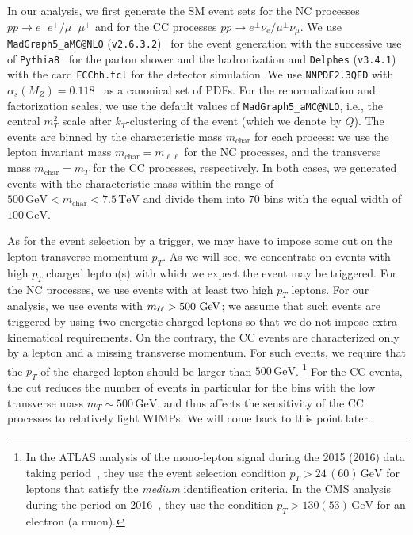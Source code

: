 \documentclass[12pt,twoside,book]{article}
\begin{document}
In our analysis, we first generate the SM event sets for the NC processes $pp\to e^{-}e^{+} / \mu^{-}\mu^{+}$ and for the CC processes $pp\to e^{\pm}\nu_e / \mu^{\pm}\nu_\mu$.
We use \texttt{MadGraph5\_aMC@NLO} (\texttt{v2.6.3.2})~\cite{Alwall:2011uj, Alwall:2014hca} for the event generation with the successive use of \texttt{Pythia8}~\cite{Sjostrand:2014zea} for the parton shower and the hadronization and \texttt{Delphes} (\texttt{v3.4.1})~\cite{deFavereau:2013fsa} with the card {\tt FCChh.tcl} for the detector simulation.
We use \texttt{NNPDF2.3QED} with $\alpha_s (M_Z) = 0.118$~\cite{Ball:2013hta} as a canonical set of PDFs.
For the renormalization and factorization scales, we use the default values of \texttt{MadGraph5\_aMC@NLO}, i.e., the central $m_T^2$ scale after $k_T$-clustering of the event (which we denote by $Q$).
The events are binned by the characteristic mass $m_{\mathrm{char}}$ for each process: we use the lepton invariant mass $m_{\mathrm{char}} = m_{\ell\ell}$ for the NC processes, and the transverse mass $m_{\mathrm{char}} = m_T$ for the CC processes, respectively.
In both cases, we generated events with the characteristic mass within the range of $500\,\mathrm{GeV} < m_\mathrm{char} < 7.5\,\mathrm{TeV}$ and divide them into $70$ bins with the equal width of $100\,\mathrm{GeV}$.

As for the event selection by a trigger, we may have to impose some cut on the lepton transverse momentum $p_T$.
As we will see, we concentrate on events with high $p_T$ charged lepton(s) with which we expect the event may be triggered.
For the NC processes, we use events with at least two high $p_T$ leptons.  For our analysis, we use events with $m_{\ell\ell}>500\ {\rm GeV}$; we assume that such events are triggered by using two energetic charged leptons so that we do not impose extra kinematical requirements.
On the contrary, the CC events are characterized only by a lepton and a missing transverse momentum.
For such events, we require that the $p_T$ of the charged lepton should be larger than $500\,\mathrm{GeV}$.
\footnote{
  In the ATLAS analysis of the mono-lepton signal during the 2015 (2016) data taking period~\cite{Aaboud:2017efa}, they use the event selection condition $p_T > 24\, (60)\,\mathrm{GeV}$ for leptons that satisfy the \textit{medium} identification criteria.
  In the CMS analysis during the period on 2016~\cite{Sirunyan:2018mpc}, they use the condition $p_T > 130 (53)\, \mathrm{GeV}$ for an electron (a muon).
}
For the CC events, the cut reduces the number of events in particular for the bins with the low transverse mass $m_T \sim 500\, \mathrm{GeV}$, and thus affects the sensitivity of the CC processes to relatively light WIMPs.
We will come back to this point later.
\end{document}
